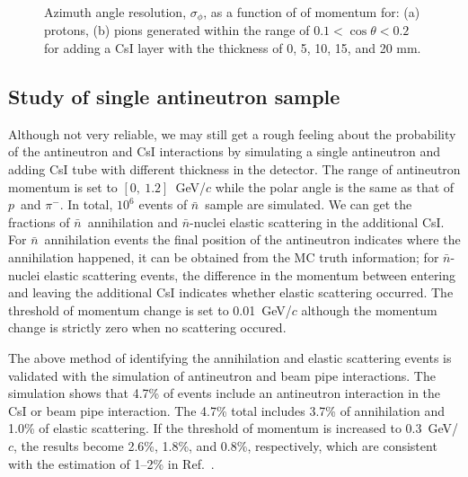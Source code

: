 \documentclass[aps,preprint,showkeys,superscriptaddress]{revtex4}
\newcommand{\pp}{$p$}
\newcommand{\pim}{$\pi^-$}
\newcommand{\nbar}{$\bar{n}$}
\newcommand{\phires}{$\sigma_\phi$}
\begin{document}
        \begin{figure}[htbp]
        	\centering  %
        	\subfigbottomskip=2pt %
        	\subfigcapskip=-5pt %
        	\caption{Azimuth angle resolution, \phires, as a function of of momentum for: (a) protons, (b) pions generated within the range of $0.1 < \cos\theta < 0.2$ for adding a CsI layer with the thickness of 0, 5, 10, 15, and 20 mm. }
        	\label{fig:phi_resolution}
        \end{figure}
        
\subsection{Study of single antineutron sample}
        
Although not very reliable, we may still get a rough feeling about the
probability of the antineutron and CsI interactions by simulating a single
antineutron and adding CsI tube with different thickness in the detector. The
range of antineutron momentum is set to $[0,~1.2]$~GeV/$c$ while the polar
angle is the same as that of \pp\ and \pim. In total, $10^6$ events of \nbar\,
sample are simulated. We can get the fractions of \nbar\ annihilation and
\nbar-nuclei elastic scattering in the additional CsI. For \nbar\ annihilation
events the final position of the antineutron indicates where the annihilation
happened, it can be obtained from the MC truth information; for \nbar-nuclei
elastic scattering events, the difference in the momentum between entering and leaving 
the additional CsI indicates whether elastic scattering occurred. 
The threshold of momentum change is set to 0.01~GeV/$c$ although
the momentum change is strictly zero when no scattering occured. 
        
The above method of identifying the annihilation and elastic scattering events
is validated with the simulation of antineutron and beam pipe interactions. The
simulation shows that 4.7\% of events include an antineutron interaction in the CsI 
or beam pipe interaction. The 4.7\% total includes 3.7\% of annihilation 
and 1.0\% of elastic scattering. If the threshold of momentum is increased 
to 0.3~GeV/$c$, the results become 2.6\%, 1.8\%, and 0.8\%, respectively, 
which are consistent with the estimation of 1--2\% in Ref.~\cite{hypronProjectileFromJpsi}. 
\end{document}
